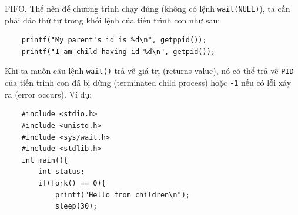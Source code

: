 \documentclass{article}
\begin{document}
\begin{enumerate}
FIFO. Thế nên để chương trình chạy đúng (không có lệnh \verb|wait(NULL)|), ta cần phải đảo thứ tự trong khối lệnh của tiến trình con như sau:
\begin{verbatim}
    printf("My parent's id is %d\n", getppid());                                                                                                                                                           
    printf("I am child having id %d\n", getpid());
\end{verbatim}
Khi ta muốn câu lệnh \verb|wait()| trả về giá trị (returns value), nó có thể trả về \verb|PID| của tiến trình con đã bị dừng (terminated child process) 
hoặc \verb|-1| nếu có lỗi xảy ra (error occurs). Ví dụ:
\begin{verbatim}
    #include <stdio.h>                                                                                                                                                                                             
    #include <unistd.h>                                                                                                                                                                                            
    #include <sys/wait.h>                                                                                                                                                                                          
    #include <stdlib.h>                                                                                                                                                                                            
    int main(){                                                                                                                                                                                                    
        int status;                                                                                                                                                                                                
        if(fork() == 0){                                                                                                                                                                                           
            printf("Hello from children\n");                                                                                                                                                                       
            sleep(30);                                                                                                                                                                                             

\end{verbatim}
\end{enumerate}
\end{document}
